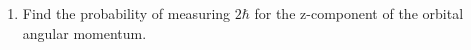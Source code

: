 \documentclass[fleqn]{article}
\begin{document}
\begin{enumerate}
\begin{enumerate}

      \item Find the probability of measuring $2 \hbar$ for the z-component of the orbital angular momentum.


    \end{enumerate}

  \end{enumerate}
\end{document}

